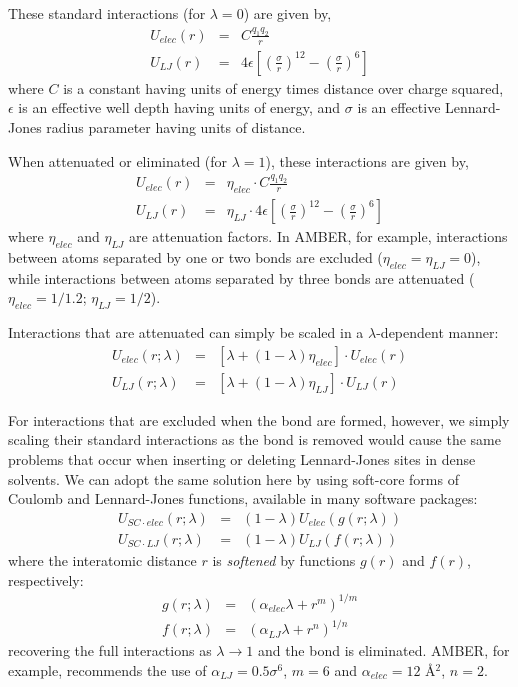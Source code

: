 \documentclass[aps,pre,twocolumn,superscriptaddress,nofootinbib]{revtex4-1}
\begin{document}
These standard interactions (for $\lambda = 0$) are given by,
\begin{eqnarray}
U_{elec}(r) &=& C\frac{q_1 q_2}{r} \nonumber \\
U_{LJ}(r) &=& 4 \epsilon \left[ \left(\frac{\sigma}{r}\right)^{12} - \left(\frac{\sigma}{r}\right)^{6} \right]
\end{eqnarray}
where $C$ is a constant having units of energy times distance over charge squared, $\epsilon$ is an effective well depth having units of energy, and $\sigma$ is an effective Lennard-Jones radius parameter having units of distance.

When attenuated or eliminated (for $\lambda = 1$), these interactions are given by,
\begin{eqnarray}
U_{elec}(r) &=& \eta_{elec} \cdot C\frac{q_1 q_2}{r} \nonumber \\
U_{LJ}(r) &=& \eta_{LJ} \cdot 4 \epsilon \left[ \left(\frac{\sigma}{r}\right)^{12} - \left(\frac{\sigma}{r}\right)^{6} \right]
\end{eqnarray}
where $\eta_{elec}$ and $\eta_{LJ}$ are attenuation factors.
In AMBER, for example, interactions between atoms separated by one or two bonds are excluded ($\eta_{elec} = \eta_{LJ} = 0$), while interactions between atoms separated by three bonds are attenuated ($\eta_{elec} = 1 / 1.2$; $\eta_{LJ} = 1/2$).

Interactions that are attenuated can simply be scaled in a $\lambda$-dependent manner:
\begin{eqnarray}
U_{elec} (r;\lambda) &=& [\lambda + (1-\lambda) \eta_{elec}] \cdot U_{elec}(r) \nonumber \\
U_{LJ} (r; \lambda) &=& [\lambda + (1 - \lambda) \eta_{LJ}] \cdot U_{LJ}(r)
\end{eqnarray}

For interactions that are excluded when the bond are formed, however, we simply scaling their standard interactions as the bond is removed would cause the same problems that occur when inserting or deleting Lennard-Jones sites in dense solvents.
We can adopt the same solution here by using soft-core forms of Coulomb and Lennard-Jones functions, available in many software packages:
\begin{eqnarray}
U_{SC \cdot elec} (r;\lambda) &=& (1-\lambda) U_{elec}(g(r; \lambda)) \nonumber \\
U_{SC \cdot LJ} (r; \lambda) &=& (1 - \lambda) U_{LJ}(f(r;\lambda))
\end{eqnarray}
where the interatomic distance $r$ is \emph{softened} by functions $g(r)$ and $f(r)$, respectively:
\begin{eqnarray}
g(r; \lambda) &=& (\alpha_{elec} \lambda + r^m)^{1/m} \nonumber \\
f(r; \lambda) &=& (\alpha_{LJ} \lambda + r^n)^{1/n} \nonumber 
\end{eqnarray}
recovering the full interactions as $\lambda \rightarrow 1$ and the bond is eliminated.
AMBER, for example, recommends the use of $\alpha_{LJ} = 0.5 \sigma^6$, $m=6$ and $\alpha_{elec} = 12$ \AA$^2$, $n = 2$.
\end{document}
